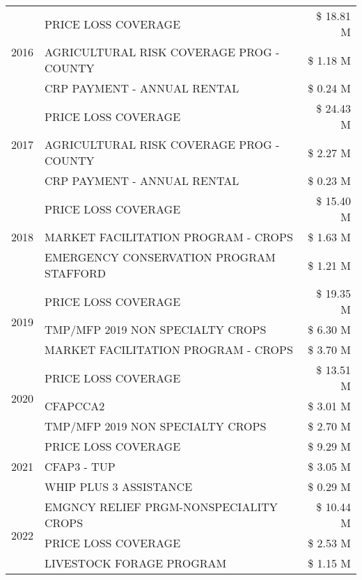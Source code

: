 \begin{tabular}{llr}
\cline{1-3}
\multirow[t]{3}{*}{2016} & PRICE LOSS COVERAGE & \$ 18.81 M \\
 & AGRICULTURAL RISK COVERAGE PROG - COUNTY & \$ 1.18 M \\
 & CRP PAYMENT - ANNUAL RENTAL & \$ 0.24 M \\
\cline{1-3}
\multirow[t]{3}{*}{2017} & PRICE LOSS COVERAGE & \$ 24.43 M \\
 & AGRICULTURAL RISK COVERAGE PROG - COUNTY & \$ 2.27 M \\
 & CRP PAYMENT - ANNUAL RENTAL & \$ 0.23 M \\
\cline{1-3}
\multirow[t]{3}{*}{2018} & PRICE LOSS COVERAGE & \$ 15.40 M \\
 & MARKET FACILITATION PROGRAM - CROPS & \$ 1.63 M \\
 & EMERGENCY CONSERVATION PROGRAM STAFFORD & \$ 1.21 M \\
\cline{1-3}
\multirow[t]{3}{*}{2019} & PRICE LOSS COVERAGE & \$ 19.35 M \\
 & TMP/MFP 2019 NON SPECIALTY CROPS & \$ 6.30 M \\
 & MARKET FACILITATION PROGRAM - CROPS & \$ 3.70 M \\
\cline{1-3}
\multirow[t]{3}{*}{2020} & PRICE LOSS COVERAGE & \$ 13.51 M \\
 & CFAPCCA2 & \$ 3.01 M \\
 & TMP/MFP 2019 NON SPECIALTY CROPS & \$ 2.70 M \\
\cline{1-3}
\multirow[t]{3}{*}{2021} & PRICE LOSS COVERAGE & \$ 9.29 M \\
 & CFAP3 - TUP & \$ 3.05 M \\
 & WHIP PLUS 3 ASSISTANCE & \$ 0.29 M \\
\cline{1-3}
\multirow[t]{3}{*}{2022} & EMGNCY RELIEF PRGM-NONSPECIALITY CROPS & \$ 10.44 M \\
 & PRICE LOSS COVERAGE & \$ 2.53 M \\
 & LIVESTOCK FORAGE PROGRAM & \$ 1.15 M \\
\cline{1-3}
\bottomrule
\end{tabular}
